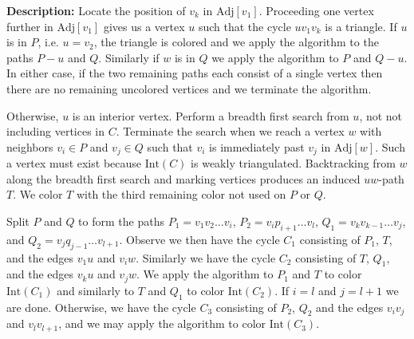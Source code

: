 \documentclass[letterpaper, 12pt]{amsart}
\theoremstyle{definition}
\theoremstyle{definition}
\theoremstyle{thm}
\theoremstyle{definition}
\begin{document}
\noindent\textbf{Description:} Locate the position of $v_k$ in $\text{Adj}[v_1]$.
Proceeding one vertex further
in $\text{Adj}[v_1]$ gives us a vertex $u$ such that the cycle $uv_1v_k$ is a triangle. If
$u$ is in $P$, i.e. $u=v_2$, the triangle is colored and we apply the algorithm
to the paths $P-u$ and $Q$. Similarly if $w$ is in $Q$ we apply the algorithm
to $P$ and $Q-u$. In either case, if the two remaining paths each consist of a
single vertex then there are no remaining uncolored vertices and we terminate
the algorithm.

Otherwise, $u$ is an interior vertex. Perform a breadth first search from $u$,
not not including vertices in $C$. Terminate the search when we reach a vertex
$w$ with neighbors $v_i\in P$ and $v_j \in Q$ such that $v_i$ is immediately
past $v_j$ in $\text{Adj}[w]$. Such a vertex must exist
because $\text{Int}(C)$ is weakly triangulated. Backtracking from $w$ along the
breadth first search and
marking vertices produces an induced $uw$-path $T$. We color $T$ with the third
remaining color not used on $P$ or $Q$.

Split $P$ and $Q$ to form the paths $P_1=v_1v_2\ldots v_i$, $P_2=v_ip_{i+1}\ldots v_l$,
$Q_1=v_kv_{k-1}\ldots v_j$, and $Q_2=v_jq_{j-1}\ldots v_{l+1}$. Observe we then
have the cycle $C_1$ consisting of $P_1$, $T$, and the edges $v_1u$ and $v_iw$.
Similarly we have the cycle $C_2$ consisting of $T$, $Q_1$, and the edges $v_ku$
and $v_jw$. We apply the algorithm to $P_1$ and $T$ to color $\text{Int}(C_1)$
and similarly to $T$ and $Q_1$ to color $\text{Int}(C_2)$. If $i=l$ and
$j=l+1$ we are done. Otherwise, we have the cycle $C_3$ consisting of $P_2$,
$Q_2$ and the edges $v_iv_j$ and $v_lv_{l+1}$, and we may apply the algorithm to
color $\text{Int}(C_3)$.
\end{document}
